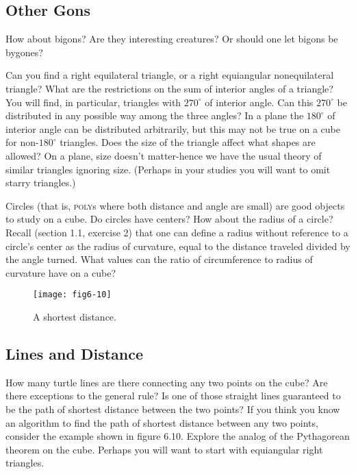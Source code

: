 \documentclass{book}
\begin{document}
\subsection{Other Gons}

How about bigons? Are they interesting creatures? Or should one let
bigons be bygones?

Can you find a right equilateral triangle, or a right equiangular nonequilateral triangle? What are the restrictions on the sum of interior
angles of a triangle? You will find, in particular, triangles with $270^{\circ}$ of
interior angle. Can this $270^{\circ}$ be distributed in any possible way among
the three angles? In a plane the $180^{\circ}$ of interior angle can be distributed
arbitrarily, but this may not be true on a cube for non-$180^{\circ}$ triangles.
Does the size of the triangle affect what shapes are allowed? On a plane,
size doesn't matter-hence we have the usual theory of similar triangles
ignoring size. (Perhaps in your studies you will want to omit starry
triangles.)

Circles (that is, \textsc{poly}s where both distance and angle are small) are
good objects to study on a cube. Do circles have centers? How about
the radius of a circle? Recall (section 1.1, exercise 2) that one can define
a radius without reference to a circle's center as the radius of curvature,
equal to the distance traveled divided by the angle turned. What values
can the ratio of circumference to radius of curvature have on a cube?

\begin{figure}
\begin{center}
\texttt{[image: fig6-10]}
\caption{A shortest distance.}
\end{center}
\end{figure}

\subsection{Lines and Distance}

How many turtle lines are there connecting any two points on the cube?
Are there exceptions to the general rule? Is one of those straight lines
guaranteed to be the path of shortest distance between the two points?
If you think you know an algorithm to find the path of shortest distance
between any two points, consider the example shown in figure 6.10.
Explore the analog of the Pythagorean theorem on the cube. Perhaps
you will want to start with equiangular right triangles.
\end{document}
